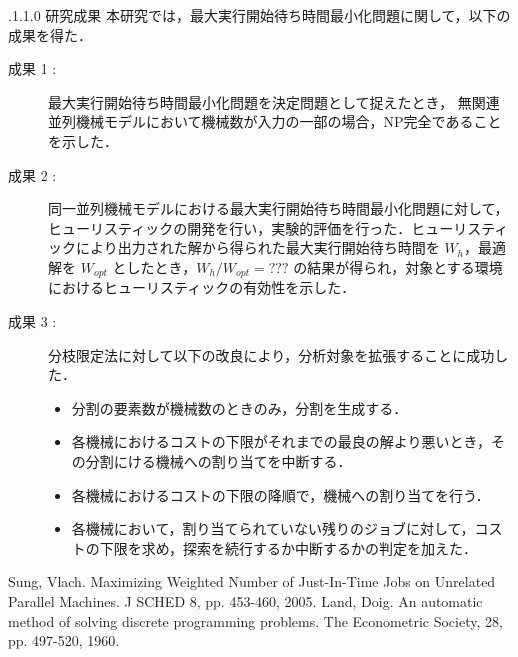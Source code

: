 \documentclass[oneside, 10pt, twocolumn]{jarticle}
\makeatletter
\def\section{\@startsection {section}{1}{\z@}{-3.5ex plus -1ex minus
-.2ex}{2.3 ex plus .2ex}{\large\bf}}
\renewcommand{\section}{
\@startsection{section}{1}{\z@}
{.1\Cvs \@plus.0\Cdp \@minus.1\Cdp}%
{.1\Cvs \@plus.1\Cdp \@minus.0\Cdp}%
{\reset@font\large\bfseries}}      %
\makeatother
\begin{document}
\section{研究成果}
本研究では，最大実行開始待ち時間最小化問題に関して，以下の成果を得た．
\begin{description}
  \item[成果 1 : ]
  最大実行開始待ち時間最小化問題を決定問題として捉えたとき，
  無関連並列機械モデルにおいて機械数が入力の一部の場合，NP完全であることを示した．
  \item[成果 2 : ]
  同一並列機械モデルにおける最大実行開始待ち時間最小化問題に対して，ヒューリスティックの開発を行い，実験的評価を行った．ヒューリスティックにより出力された解から得られた最大実行開始待ち時間を $W_h$，最適解を $W_{opt}$ としたとき，$W_h/W_{opt} = ???$ の結果が得られ，対象とする環境におけるヒューリスティックの有効性を示した．
  \item[成果 3 : ]
  分枝限定法に対して以下の改良により，分析対象を拡張することに成功した．
  \begin{itemize}
    \item 分割の要素数が機械数のときのみ，分割を生成する．
    \item 各機械におけるコストの下限がそれまでの最良の解より悪いとき，その分割にける機械への割り当てを中断する．
    \item 各機械におけるコストの下限の降順で，機械への割り当てを行う．
    \item 各機械において，割り当てられていない残りのジョブに対して，コストの下限を求め，探索を続行するか中断するかの判定を加えた．
  \end{itemize}
\end{description}

\begin{thebibliography}{9} %
Sung, Vlach.
Maximizing Weighted Number of Just-In-Time Jobs on Unrelated Parallel Machines. J SCHED 8, pp. 453-460, 2005.
Land, Doig.
An automatic method of solving discrete programming problems.
The Econometric Society, 28, pp. 497-520, 1960.
\end{thebibliography}
\end{document}
